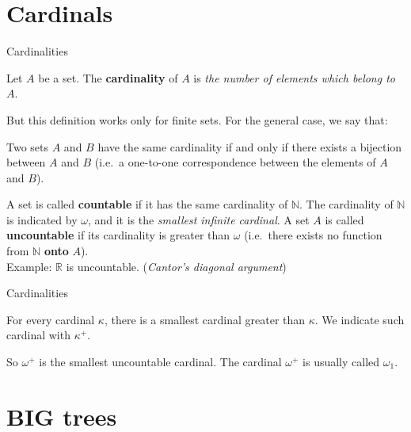 \documentclass{beamer}
\theoremstyle{num.custom-title}
\theoremstyle{custom-title}
\newcommand{\N}{\mathbb{N}}
\newcommand{\R}{\mathbb{R}}
\renewcommand{\emph}[1]{\textbf{#1}}
\begin{document}
\section{Cardinals}


\begin{frame}{Cardinalities}

Let $A$ be a set. The \emph{cardinality} of $A$ is \textit{the number of elements which belong to $A$}.

But this definition works only for finite sets. For the general case, we say that:

\begin{definition}
Two sets $A$ and $B$ have the same cardinality if and only if there exists a bijection between $A$ and $B$ (i.e.\ a one-to-one correspondence between the elements of $A$ and $B$).
\end{definition}

A set is called \emph{countable} if it has the same cardinality of $\N$. The cardinality of $\N$ is indicated by $\omega$, and it is the \textit{smallest infinite cardinal}. A set $A$ is called \emph{uncountable} if its cardinality is greater than $\omega$ (i.e.\ there exists no function from $\N$ \emph{onto} $A$).\\
Example: $\R$ is uncountable. (\textit{Cantor's diagonal argument})

\end{frame}


\begin{frame}{Cardinalities}

For every cardinal $\kappa$, there is a smallest cardinal greater than $\kappa$. We indicate such cardinal with $\kappa^+$.

So $\omega^+$ is the smallest uncountable cardinal. The cardinal $\omega^+$ is usually called $\omega_1$.

\end{frame}


\section{BIG trees}
\end{document}
